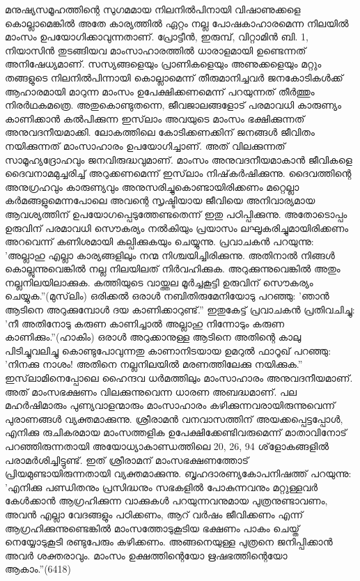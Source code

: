 മനുഷ്യസമൂഹത്തിന്റെ സുഗമമായ നിലനില്‍പിനായി വിഷാണുക്കളെ കൊല്ലാമെങ്കില്‍ അതേ കാര്യത്തില്‍ ഏറ്റം നല്ല പോഷകാഹാരമെന്ന നിലയില്‍ മാംസം ഉപയോഗിക്കാവുന്നതാണ്. പ്രോട്ടീന്‍, ഇരുമ്പ്, വിറ്റാമിന്‍ ബി. 1, നിയാസിന്‍ തുടങ്ങിയവ മാംസാഹാരത്തില്‍ ധാരാളമായി ഉണ്ടെന്നത് അനിഷേധ്യമാണ്. സസ്യങ്ങളെയും പ്രാണികളെയും അണുക്കളെയും മറ്റും തങ്ങളുടെ നിലനില്‍പിന്നായി കൊല്ലാമെന്ന് തീരുമാനിച്ചവര്‍ ജനകോടികള്‍ക്ക് ആഹാരമായി മാറുന്ന മാംസം ഉപേക്ഷിക്കണമെന്ന് പറയുന്നത് തീര്‍ത്തും നിരര്‍ഥകമത്രെ.
അതുകൊണ്ടുതന്നെ, ജീവജാലങ്ങളോട് പരമാവധി കാരുണ്യം കാണിക്കാന്‍ കല്‍പിക്കുന്ന ഇസ്‌ലാം അവയുടെ മാംസം ഭക്ഷിക്കുന്നത് അനുവദനീയമാക്കി. ലോകത്തിലെ കോടിക്കണക്കിന് ജനങ്ങള്‍ ജീവിതം നയിക്കുന്നത് മാംസാഹാരം ഉപയോഗിച്ചാണ്. അത് വിലക്കുന്നത് സാമൂഹ്യദ്രോഹവും ജനവിരുദ്ധവുമാണ്.
മാംസം അനുവദനീയമാകാന്‍ ജീവികളെ ദൈവനാമമുച്ചരിച്ച് അറുക്കണമെന്ന് ഇസ്‌ലാം നിഷ്‌കര്‍ഷിക്കുന്നു. ദൈവത്തിന്റെ അനുഗ്രഹവും കാരുണ്യവും അനുസരിച്ചുകൊണ്ടായിരിക്കണം മറ്റെല്ലാ കര്‍മങ്ങളുമെന്നപോലെ അവന്റെ സൃഷ്ടിയായ ജീവിയെ അനിവാര്യമായ ആവശ്യത്തിന് ഉപയോഗപ്പെടുത്തേണ്ടതെന്ന് ഇതു പഠിപ്പിക്കുന്നു. അതോടൊപ്പം ഉരുവിന് പരമാവധി സൌകര്യം നല്‍കിയും പ്രയാസം ലഘൂകരിച്ചുമായിരിക്കണം അറവെന്ന് കണിശമായി കല്പിക്കുകയും ചെയ്യുന്നു. പ്രവാചകന്‍ പറയുന്നു: 'അല്ലാഹു എല്ലാ കാര്യങ്ങളിലും നന്മ നിശ്ചയിച്ചിരിക്കുന്നു. അതിനാല്‍ നിങ്ങള്‍ കൊല്ലുന്നുവെങ്കില്‍ നല്ല നിലയിലത് നിര്‍വഹിക്കുക. അറുക്കുന്നുവെങ്കില്‍ അതും നല്ലനിലയിലാക്കുക. കത്തിയുടെ വായ്ത്തല മൂര്‍ച്ചകൂട്ടി ഉരുവിന് സൌകര്യം ചെയ്യുക.''(മുസ്‌ലിം)
ഒരിക്കല്‍ ഒരാള്‍ നബിതിരുമേനിയോടു പറഞ്ഞു: 'ഞാന്‍ ആടിനെ അറുക്കുമ്പോള്‍ ദയ കാണിക്കാറുണ്ട്.'' ഇതുകേട്ട് പ്രവാചകന്‍ പ്രതിവചിച്ചു: 'നീ അതിനോടു കരുണ കാണിച്ചാല്‍ അല്ലാഹു നിന്നോടും കരുണ കാണിക്കും.''(ഹാകിം)
ഒരാള്‍ അറുക്കാനുള്ള ആടിനെ അതിന്റെ കാലു പിടിച്ചുവലിച്ചു കൊണ്ടുപോവുന്നതു കാണാനിടയായ ഉമറുല്‍ ഫാറൂഖ് പറഞ്ഞു: 'നിനക്കു നാശം! അതിനെ നല്ലനിലയില്‍ മരണത്തിലേക്കു നയിക്കുക.''
ഇസ്‌ലാമിനെപ്പോലെ ഹൈന്ദവ ധര്‍മത്തിലും മാംസാഹാരം അനുവദനീയമാണ്. അത് മാംസഭക്ഷണം വിലക്കുന്നുവെന്ന ധാരണ അബദ്ധമാണ്. പല മഹര്‍ഷിമാരും പുണ്യവാളന്മാരും മാംസാഹാരം കഴിക്കുന്നവരായിരുന്നുവെന്ന് പുരാണങ്ങള്‍ വ്യക്തമാക്കുന്നു. ശ്രീരാമന്‍ വനവാസത്തിന് അയക്കപ്പെട്ടപ്പോള്‍, എനിക്കു രുചികരമായ മാംസത്തളിക ഉപേക്ഷിക്കേണ്ടിവരുമെന്ന് മാതാവിനോട് പറഞ്ഞിരുന്നതായി അയോധ്യാകാണ്ഡത്തിലെ 20, 26, 94 ശ്‌ളോകങ്ങളില്‍ പരാമര്‍ശിച്ചിട്ടുണ്ട്. ഇത് ശ്രീരാമന് മാംസഭക്ഷണത്തോട് പ്രിയമുണ്ടായിരുന്നതായി വ്യക്തമാക്കുന്നു.
ബൃഹദാരണ്യകോപനിഷത്ത് പറയുന്നു: 'എനിക്കു പണ്ഡിതനും പ്രസിദ്ധനും സഭകളില്‍ പോകുന്നവനും മറ്റുള്ളവര്‍ കേള്‍ക്കാന്‍ ആഗ്രഹിക്കുന്ന വാക്കുകള്‍ പറയുന്നവനുമായ പുത്രനുണ്ടാവണം, അവന്‍ എല്ലാ വേദങ്ങളും പഠിക്കണം, ആറ് വര്‍ഷം ജീവിക്കണം എന്ന് ആഗ്രഹിക്കുന്നുണ്ടെങ്കില്‍ മാംസത്തോടുകൂടിയ ഭക്ഷണം പാകം ചെയ്ത് നെയ്യോടുകൂടി രണ്ടുപേരും കഴിക്കണം. അങ്ങനെയുള്ള പുത്രനെ ജനിപ്പിക്കാന്‍ അവര്‍ ശക്തരാവും. മാംസം ഉക്ഷത്തിന്റെയോ ഋഷഭത്തിന്റെയോ ആകാം.''(6418) 
